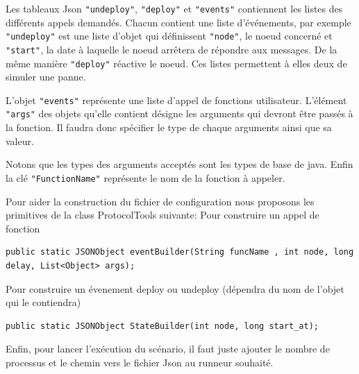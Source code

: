 \documentclass{article}
\begin{document}
			Les tableaux Json \lstinline{"undeploy"}, \lstinline{"deploy"} et \lstinline{"events"} contiennent
			les listes des différents appels demandés.
			Chacun contient une liste d'événements, par exemple \lstinline{"undeploy"} est une liste
			d'objet qui définissent \lstinline{"node"}, le noeud concerné et \lstinline{"start"}, la
			date à laquelle le noeud arrêtera de répondre aux messages.
			De la même manière \lstinline{"deploy"} réactive le noeud. Ces listes permettent à elles
			deux de simuler une panne.
			\bigskip

			L'objet \lstinline{"events"} représente une liste d'appel de fonctions utilisateur.
			L'élément \lstinline{"args"} des objets qu'elle contient désigne les arguments qui
			devront être passés à la fonction. Il faudra donc spécifier le type de chaque arguments
			ainsi que sa valeur.

			Notons que les types des arguments acceptés sont les types de base de java.
			Enfin la clé \lstinline{"FunctionName"} représente le nom de la fonction à appeler.
			\bigskip

			Pour aider la construction du fichier de configuration nous proposons les primitives de la class ProtocolTools suivante:
			\newline
			Pour construire un appel de fonction
			\begin{lstlisting}
public static JSONObject eventBuilder(String funcName , int node, long delay, List<Object> args);
			\end{lstlisting}
			Pour construire un évenement deploy ou undeploy 
			\newline
			(dépendra du nom de l'objet qui le contiendra)
			\begin{lstlisting}
public static JSONObject StateBuilder(int node, long start_at);
			\end{lstlisting}

			Enfin, pour lancer l'exécution du scénario, il faut juste ajouter le nombre de processus et le chemin vers le fichier Json au runneur souhaité.

		
\end{document}
